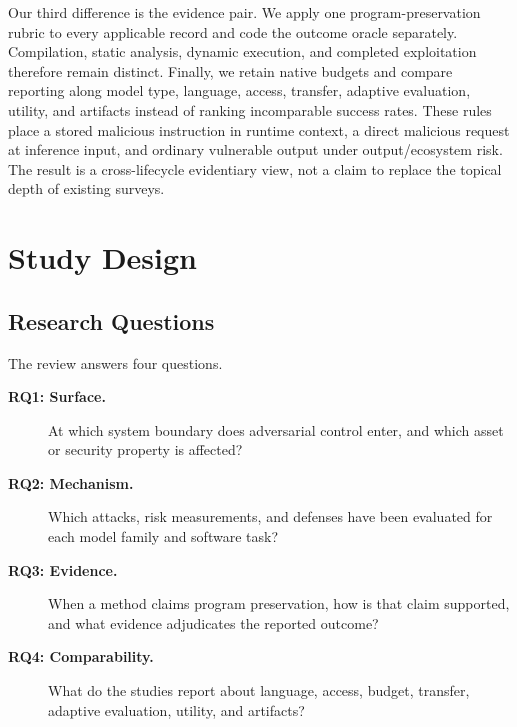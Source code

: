 \documentclass[acmsmall,screen,review]{acmart}
\begin{document}
Our third difference is the evidence pair. We apply one program-preservation rubric to every applicable record and code the outcome oracle separately. Compilation, static analysis, dynamic execution, and completed exploitation therefore remain distinct. Finally, we retain native budgets and compare reporting along model type, language, access, transfer, adaptive evaluation, utility, and artifacts instead of ranking incomparable success rates. These rules place a stored malicious instruction in runtime context, a direct malicious request at inference input, and ordinary vulnerable output under output/ecosystem risk. The result is a cross-lifecycle evidentiary view, not a claim to replace the topical depth of existing surveys.

\section{Study Design} \label{sec:method}

\subsection{Research Questions}
The review answers four questions.
\begin{description}
\item[\textbf{RQ1: Surface.}] At which system boundary does adversarial control enter, and which asset or security property is affected?
\item[\textbf{RQ2: Mechanism.}] Which attacks, risk measurements, and defenses have been evaluated for each model family and software task?
\item[\textbf{RQ3: Evidence.}] When a method claims program preservation, how is that claim supported, and what evidence adjudicates the reported outcome?
\item[\textbf{RQ4: Comparability.}] What do the studies report about language, access, budget, transfer, adaptive evaluation, utility, and artifacts?
\end{description}
\end{document}
